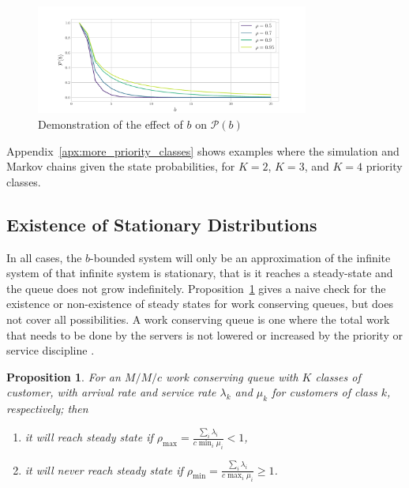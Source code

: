 \documentclass{article}
\newtheorem{prop}{Proposition}
\begin{document}
\begin{figure}
  \begin{center}
    \includegraphics[width=0.8\textwidth]{img/hitting_accuracy.pdf}
  \end{center}
  \caption{Demonstration of the effect of $b$ on $\mathcal{P}(b)$}
  \label{fig:hitting_accuracy}
\end{figure}

Appendix~\ref{apx:more_priority_classes} shows examples where the simulation and
Markov chains given the state probabilities, for $K = 2$, $K = 3$, and $K = 4$
priority classes.

\subsection{Existence of Stationary Distributions}\label{sec:stationary}
In all cases, the $b$-bounded system will only be an approximation of the
infinite system of that infinite system is stationary, that is it reaches a
steady-state and the queue does not grow indefinitely.
Proposition~\ref{thrm:steadystate} gives a naive check for the existence or
non-existence of steady states for work conserving queues, but does not cover
all possibilities. A work conserving queue is one where the total work that
needs to be done by the servers is not lowered or increased by the priority or
service discipline \cite{wolff70}.

\begin{prop}\label{thrm:steadystate}
For an $M/M/c$ work conserving queue with $K$ classes of customer, with arrival
rate and service rate $\lambda_k$ and  $\mu_k$ for customers of class $k$,
respectively; then
\begin{enumerate}
  \item it will reach steady state if
  $\rho_{\max} = \frac{\sum_i \lambda_i}{c \min_i \mu_i} < 1$,
  \item it will never reach steady state if
  $\rho_{\min} = \frac{\sum_i \lambda_i}{c \max_i \mu_i} \geq 1$.
\end{enumerate}
\end{prop}
\end{document}
